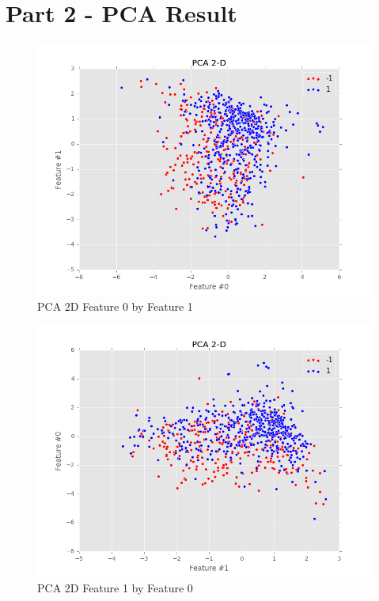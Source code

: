 \documentclass[12pt]{article}
\begin{document}
\section*{Part 2 - PCA Result}
\begin{figure}[H]
\begin{center}
\includegraphics[scale=0.64]{PCA-graph1.png}
\caption{PCA 2D Feature 0 by Feature 1}
\end{center}
\end{figure}

\begin{figure}[H]
\begin{center}
\includegraphics[scale=0.64]{PCA-graph2.png}
\caption{PCA 2D Feature 1 by Feature 0}
\end{center}
\end{figure}
\end{document}
